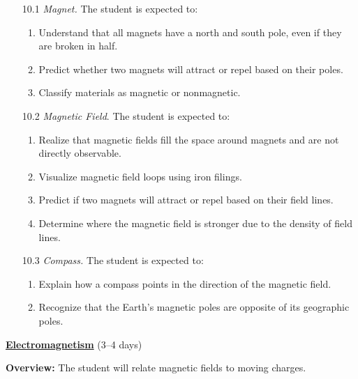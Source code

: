 \documentclass[dvipsnames]{article}
\begin{document}
\begin{enumerate}[topsep=0pt]
    \item[10.1] \textit{Magnet.} The student is expected to:
    \begin{enumerate}[topsep=0pt,itemsep=0pt]
        \item Understand that all magnets have a north and south pole, even if they are broken in half.
        \item Predict whether two magnets will attract or repel based on their poles.
        \item Classify materials as magnetic or nonmagnetic.
    \end{enumerate}
    \item[10.2] \textit{Magnetic Field}. The student is expected to:
    \begin{enumerate}[topsep=0pt,itemsep=0pt]
        \item Realize that magnetic fields fill the space around magnets and are not directly observable.
        \item Visualize magnetic field loops using iron filings.
        \item Predict if two magnets will attract or repel based on their field lines.
        \item Determine where the magnetic field is stronger due to the density of field lines.
    \end{enumerate}
    \item[10.3] \textit{Compass.} The student is expected to:
    \begin{enumerate}[topsep=0pt,itemsep=0pt]
        \item Explain how a compass points in the direction of the magnetic field.
        \item Recognize that the Earth's magnetic poles are opposite of its geographic poles.
    \end{enumerate}
\end{enumerate}

\textbf{\underline{Electromagnetism}} (3--4 days)

\textbf{Overview:} The student will relate magnetic fields to moving charges.
\end{document}
